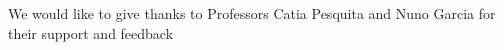 \documentclass[a1paper, 14pt]{extarticle}
\newcommand{\fcap}[1]{{\LARGE\itshape #1}}
\begin{document}
\begin{minipage}[t]{0.48\textwidth}
\vspace{6cm}
{\large We would like to give thanks to Professors Catia Pesquita and Nuno Garcia for their support and feedback}

\end{minipage}







\end{document}
